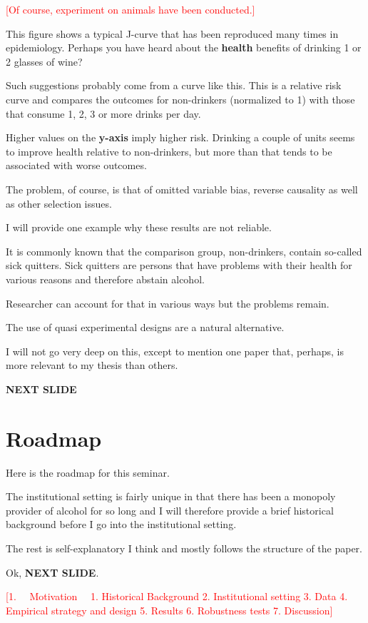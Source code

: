 \documentclass[12pt]{article}
\newcommand{\TODO}[1]{\textcolor{red}{[#1]}}
\begin{document}
\TODO{Of course, experiment on animals have been conducted.}

This figure shows a typical J-curve that has been reproduced many times in epidemiology. Perhaps you have heard about the  \textbf{health} benefits of drinking 1 or 2 glasses of wine? 

Such suggestions probably come from a curve like this. This is a relative risk curve and compares the outcomes for non-drinkers (normalized to 1) with those that consume 1, 2, 3 or more drinks per day. 

Higher values on the  \textbf{y-axis} imply higher risk. Drinking a couple of units seems to improve health relative to non-drinkers, but more than that tends to be associated with worse outcomes.

The problem, of course, is that of omitted variable bias, reverse causality as well as other selection issues. 

I will provide one example why these results are not reliable. 

It is commonly known that the comparison group,  non-drinkers, contain so-called sick quitters. Sick quitters are persons that have problems with their health for various reasons and therefore abstain alcohol.

Researcher can account for that in various ways but the problems remain.

The use of quasi experimental designs are a natural alternative. 

I will not go very deep on this, except to mention one paper that, perhaps, is more relevant to my thesis than others. 


\textbf{NEXT SLIDE}
\section{Roadmap}

Here is the roadmap for this seminar.

The institutional setting is fairly unique in that there has been a monopoly provider of alcohol for so long and I will therefore provide a brief historical background before I go into the institutional setting. 

The rest is self-explanatory I think and mostly follows the structure of the paper.

Ok, \textbf{NEXT SLIDE}.

\TODO{1. ~~Motivation~~
1.  Historical Background 
2.  Institutional setting
3.  Data
4.  Empirical strategy and design
5.  Results
6.  Robustness tests
7.  Discussion}
\end{document}

